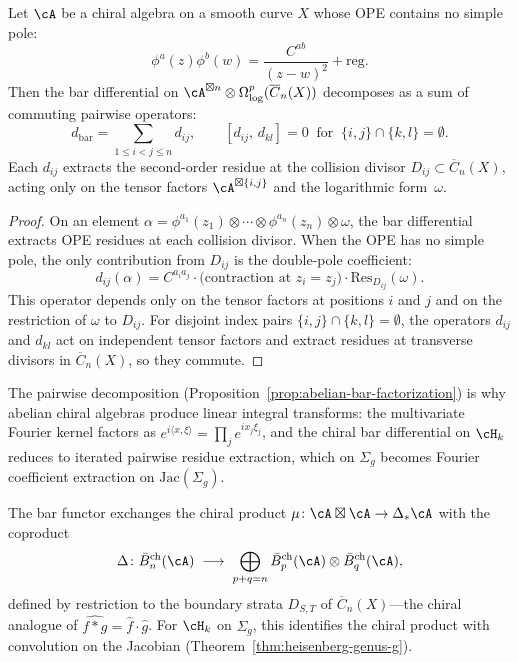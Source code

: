 \begin{proposition}
\label{prop:abelian-bar-factorization}
Let\/ $\cA$ be a chiral algebra on a smooth curve $X$ whose OPE
contains no simple pole:
\[
\phi^a(z)\phi^b(w)
= \frac{C^{ab}}{(z-w)^2} + \mathrm{reg}.
\]
Then the bar differential on
$\cA^{\boxtimes n} \otimes \Omega^p_{\log}(\overline{C}_n(X))$
decomposes as a sum of commuting pairwise operators:
\[
d_{\mathrm{bar}} = \sum_{1 \leq i < j \leq n} d_{ij},
\qquad
[d_{ij},\, d_{kl}] = 0
\;\;\text{for}\;\;
\{i,j\} \cap \{k,l\} = \emptyset.
\]
Each $d_{ij}$ extracts the second-order residue at the collision
divisor $D_{ij} \subset \overline{C}_n(X)$, acting only on the
tensor factors $\cA^{\boxtimes\{i,j\}}$ and the logarithmic
form~$\omega$.
\end{proposition}

\begin{proof}
On an element
$\alpha = \phi^{a_1}(z_1) \otimes \cdots \otimes \phi^{a_n}(z_n)
\otimes \omega$,
the bar differential extracts OPE residues at each collision
divisor.  When the OPE has no simple pole, the only contribution
from $D_{ij}$ is the double-pole coefficient:
\[
d_{ij}(\alpha)
= C^{a_i a_j}
  \cdot \bigl(\text{contraction at } z_i = z_j\bigr)
  \cdot \mathrm{Res}_{D_{ij}}(\omega).
\]
This operator depends only on the tensor factors at positions $i$
and $j$ and on the restriction of $\omega$ to $D_{ij}$.  For
disjoint index pairs $\{i,j\} \cap \{k,l\} = \emptyset$, the
operators $d_{ij}$ and $d_{kl}$ act on independent tensor factors
and extract residues at transverse divisors in
$\overline{C}_n(X)$, so they commute.
\end{proof}

\begin{remark}
\label{rem:pairwise-to-fourier}
The pairwise decomposition (Proposition~\ref{prop:abelian-bar-factorization}) is why abelian chiral algebras produce linear integral transforms: the multivariate Fourier kernel factors as $e^{i\langle x,\xi\rangle} = \prod_j e^{ix_j\xi_j}$, and the chiral bar differential on $\cH_k$ reduces to iterated pairwise residue extraction, which on $\Sigma_g$ becomes Fourier coefficient extraction on $\mathrm{Jac}(\Sigma_g)$.
\end{remark}

\begin{remark}
\label{rem:convolution-exchange}
The bar functor exchanges the chiral product $\mu\colon \cA \boxtimes \cA \to \Delta_* \cA$ with the coproduct
\[
\Delta\colon \bar{B}^{\mathrm{ch}}_n(\cA)
\;\longrightarrow\;
\bigoplus_{p+q=n} \bar{B}^{\mathrm{ch}}_p(\cA)
  \otimes \bar{B}^{\mathrm{ch}}_q(\cA),
\]
defined by restriction to the boundary strata $D_{S,T}$ of $\overline{C}_n(X)$---the chiral analogue of $\widehat{f * g} = \hat{f} \cdot \hat{g}$.  For $\cH_k$ on $\Sigma_g$, this identifies the chiral product with convolution on the Jacobian (Theorem~\ref{thm:heisenberg-genus-g}).
\end{remark}


